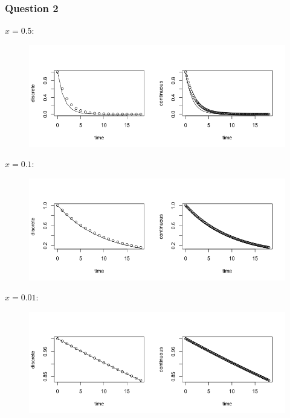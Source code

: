 \documentclass{article}
\begin{document}
        \subsubsection*{Question 2}
            $x = 0.5$:
            \begin{figure}[ht!]
                \centering
                \includegraphics[scale=0.4]{fig1.png}\\
            \end{figure}
            \FloatBarrier
            $x = 0.1$:
            \begin{figure}[ht!]
                \centering
                \includegraphics[scale=0.4]{fig2.png}\\
            \end{figure}
            \FloatBarrier
            $x = 0.01$:
            \begin{figure}[ht!]
                \centering
                \includegraphics[scale=0.4]{fig3.png}\\
            \end{figure}
            \FloatBarrier
\end{document}
